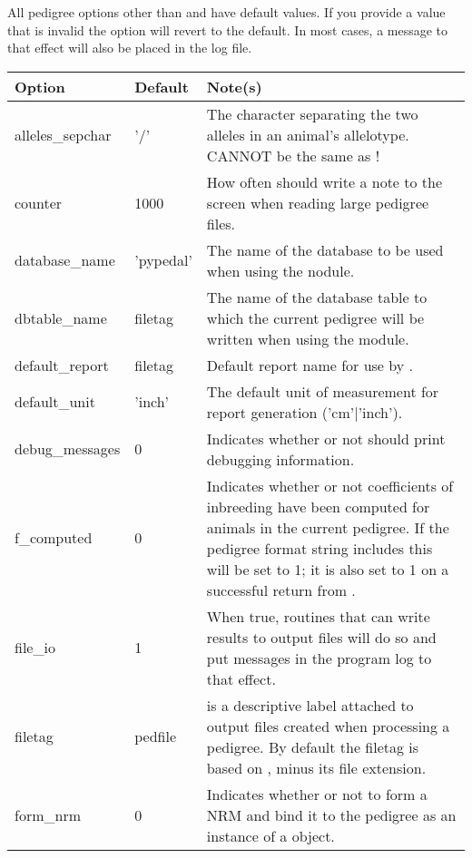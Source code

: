 All pedigree options other than  and  have default values.  If you provide a value that is invalid the option will revert to the default.  In most cases, a message to that effect will also be placed in the log file.
\label{tbl:options}
\begin{center}
    \tablehead{\hline}
    \tabletail{\hline}
    \begin{supertabular}{l|l|p{4in}}
    \hline
    Option & Default & Note(s) \\
    \hline
    alleles\_sepchar  & '/'          & The character separating the two alleles in an animal's allelotype.  CANNOT be the same as ! \\
    counter          & 1000         & How often should \PyPedal{} write a note to the screen when reading large pedigree files. \\
    database\_name   & 'pypedal'    & The name of the database to be used when using the  nodule. \\
    dbtable\_name     & filetag      & The name of the database table to which the current pedigree will be written when using the  module. \\
    default_report   & filetag      & Default report name for use by . \\
    default_unit     & 'inch'       & The default unit of measurement for report generation ('cm'|'inch'). \\
    debug\_messages  & 0            & Indicates whether or not \PyPedal{} should print debugging information. \\
    f\_computed       & 0            & Indicates whether or not coefficients of inbreeding  have been computed for animals in the current pedigree.  If the pedigree format string includes  this will be set to 1; it is also set to 1 on a successful return from . \\
    file\_io         & 1            & When true, routines that can write results to output files will do so and put messages in the program log to that effect. \\
    filetag          & pedfile      &  is a descriptive label attached to output files created when processing a pedigree.  By default the filetag is based on , minus its file extension. \\
    form\_nrm        & 0            & Indicates whether or not to form a NRM and bind it to the pedigree as an instance of a  object. \\

\end{supertabular}
\end{center}
